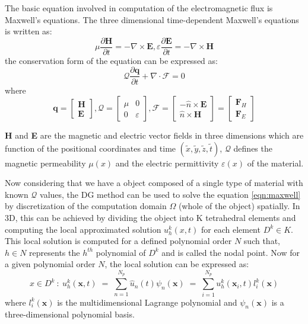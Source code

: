 The basic equation involved in computation of the electromagnetic flux is Maxwell's equations. The
three dimensional time-dependent Maxwell's equations \cite{hesthaven_nodal_2008} is written as:
\begin{equation}\label{eqn:maxwellbase}
    \mu \frac{\partial{\textbf{H}}}{\partial{t}} = - \nabla \times \textbf{E},\varepsilon \frac{\partial{\textbf{E}}}{ \partial{t}} = - \nabla  \times \textbf{H}
\end{equation}
the conservation form of the equation can be expressed as:
\begin{equation}\label{eqn:maxwell}
    \mathcal{Q}\frac{\partial\textbf{q}}{\partial{t}}  + \nabla  \cdot \mathcal{F} = 0
\end{equation}
where
\begin{equation}\label{eqn:maxwellexpansion}
\textbf{q} =  \begin{bmatrix}\textbf{H} \\ \textbf{E} \end{bmatrix},
\mathcal{Q} =  \begin{bmatrix} \mu & 0 \\ 0 &  \varepsilon \end{bmatrix},
\mathcal{F} = \begin{bmatrix}  - \widehat{n} \times \textbf{E} \\ \widehat{n} \times \textbf{H} \end{bmatrix} = \begin{bmatrix} \textbf{F}_H \\ \textbf{F}_E \end{bmatrix}
\end{equation}

\textbf{H} and \textbf{E} are the magnetic and electric vector fields in
three dimensions which are function of the positional coordinates and time
$ (\tilde{x},\tilde{y}, \tilde{z}, \tilde{t}) $, $ \mathcal{Q} $ defines the magnetic permeability
$ \mu(x) $ and the electric permittivity $ \varepsilon(x) $ of the material.

Now considering that we have a object composed of a single type of material with known $ \mathcal{Q} $
values, the DG method can be used to solve the equation \ref{eqn:maxwell} by discretization of the
computation domain $ \Omega $ (whole of the object) spatially. In 3D, this can be achieved by dividing the object
into K tetrahedral elements and computing the local approximated solution $ u_h^k(x,t) $ for
each element $ D^k \in K $. This local solution is computed for a defined polynomial order $ N $ such that,
$ h \in N $ represents the $ h^{th} $ polynomial of $ D^k $ and is called the nodal point.
Now for a given polynomial order $ N $, the local solution can be expressed \cite{hesthaven_nodal_2008} as:
\begin{equation}\label{eqn:nodal_form}
    x \in D^k \ : \ u^k_{h}(\textbf{x}, t) \; = \; \sum_{n=1}^{N_p} \hat{u}_n(t) \psi_{n}(\textbf{x}) \; = \; \sum_{i=1}^{N_p} u^k_{h}(\textbf{x}_{i}, t) l^k_{i}(\textbf{x})
\end{equation}
where $ l^k_{i}(\textbf{x}) $ is the multidimensional Lagrange polynomial and $ \psi_{n}(\textbf{x}) $
is a three-dimensional polynomial basis.

